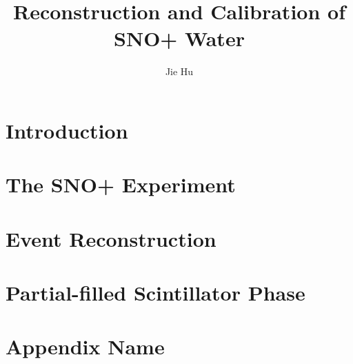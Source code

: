 \documentclass[phd,black]{PrincetonThesis}
\title{Reconstruction and Calibration of SNO+ Water}
\author{Jie Hu}
\begin{document}
\begin{frontmatter}
  
  \begin{thesisabstract}
    
  \end{thesisabstract}
  
  \begin{acknowledgements}
    
  \end{acknowledgements}
  
\end{frontmatter}

\cleardoublepage
\chapter{Introduction}



\chapter{The SNO+ Experiment}


\chapter{Event Reconstruction}

\chapter{Partial-filled Scintillator Phase}


\appendix

\cleardoublepage
\chapter{Appendix Name}
	
	\cleardoublepage
	\nocite{*} %
	
	
\end{document}
